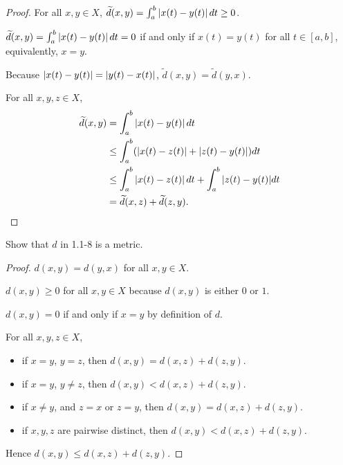 \begin{proof}
    For all $x, y\in X$, $\widetilde{d}(x, y) = \int^{b}_{a}\left\vert{x(t) - y(t)}\right\vert dt\geq 0$.

    $\widetilde{d}(x, y) = \int^{b}_{a}\left\vert{x(t) - y(t)}\right\vert dt = 0$ if and only if $x(t) = y(t)$ for all $t\in [a, b]$, equivalently, $x = y$.

    Because $\left\vert{x(t) - y(t)}\right\vert = \left\vert{y(t) - x(t)}\right\vert$, $\widetilde{d}(x, y) = \widetilde{d}(y, x)$.

    For all $x, y, z\in X$,
    \begin{align*}
        \widetilde{d}(x, y) & = \int^{b}_{a}\left\vert{x(t) - y(t)}\right\vert dt                                        \\
                            & \leq \int^{b}_{a}(\left\vert{x(t) - z(t)}\right\vert + \left\vert{z(t) - y(t)}\right\vert)dt               \\
                            & \leq \int^{b}_{a}\left\vert{x(t) - z(t)}\right\vert dt + \int^{b}_{a}{\left\vert{z(t) - y(t)}\right\vert}dt \\
                            & = \widetilde{d}(x, z) + \widetilde{d}(z, y).\qedhere
    \end{align*}
\end{proof}

\begin{exercise}\label{chapter1:section1:exercise9}
    Show that $d$ in 1.1-8 is a metric.
\end{exercise}

\begin{proof}
    $d(x, y) = d(y, x)$ for all $x, y\in X$.

    $d(x, y)\geq 0$ for all $x, y\in X$ because $d(x, y)$ is either $0$ or $1$.

    $d(x, y) = 0$ if and only if $x = y$ by definition of $d$.

    For all $x, y, z\in X$,
    \begin{itemize}
        \item if $x = y$, $y = z$, then $d(x, y) = d(x, z) + d(z, y)$.
        \item if $x = y$, $y\ne z$, then $d(x, y) < d(x, z) + d(z, y)$.
        \item if $x\ne y$, and $z = x$ or $z = y$, then $d(x, y) = d(x, z) + d(z, y)$.
        \item if $x, y, z$ are pairwise distinct, then $d(x, y) < d(x, z) + d(z, y)$.
    \end{itemize}

    Hence $d(x, y)\leq d(x, z) + d(z, y)$.
\end{proof}


